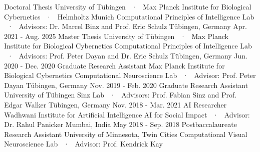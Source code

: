 
\begin{cventries}
\vspace{-12mm}
  \cventryEd
    {} %
    {} %
    {}
    {}
    {} %
    {} %
    \cventryLab
    {Doctoral Thesis}
    {University of Tübingen ~·~ Max Planck Institute for Biological Cybernetics  ~·~ Helmholtz Munich} %
    {Computational Principles of Intelligence Lab ~·~ Advisors: Dr. Marcel Binz and Prof. Eric Schulz}%
    {Tübingen, Germany} %
    {Apr. 2021 - Aug. 2025}
    {}
    \cventryLab
    {Master Thesis}
    {University of Tübingen ~·~ Max Planck Institute for Biological Cybernetics} %
    {Computational Principles of Intelligence Lab ~·~ Advisors: Prof. Peter Dayan and Dr. Eric Schulz}%
    {Tübingen, Germany} %
    {Jun. 2020 - Dec. 2020}
    {}
   \cventryLab
    {Graduate Research Assistant} %
    {Max Planck Institute for Biological Cybernetics} %
    {Computational Neuroscience Lab ~·~ Advisor: Prof. Peter Dayan}%
    {Tübingen, Germany} %
    {Nov. 2019 - Feb. 2020}
    {}
  \cventryLab
    {Graduate Research Assistant} %
    {University of Tübingen} %
    {Sinz Lab ~·~ Advisors: Prof. Fabian Sinz and Prof. Edgar Walker} %
    {Tübingen, Germany} %
    {Nov. 2018 - Mar. 2021} %
    {}
   \cventryLab
    {AI Researcher} %
    {Wadhwani Institute for Artificial Intelligence} %
    {AI for Social Impact ~·~ Advisor: Dr. Rahul Panicker} %
    {Mumbai, India} %
    {May 2018 - Sep. 2018} %
    {}
   \cventryLab
    {Postbaccalaureate Research Assistant} %
    {University of Minnesota, Twin Cities} %
    {Computational Visual Neuroscience Lab ~·~ Advisor: Prof. Kendrick Kay} %

\end{cventries}
